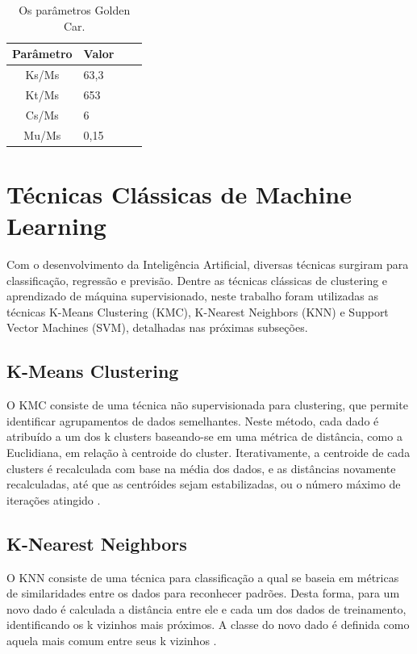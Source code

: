 \begin{table}[h!]
    \caption{Os parâmetros Golden Car.}
    \label{table:golden_car_parameters}
    \centering
    \small
    \begin{tabular}{clll}
        \toprule
        \textbf{Parâmetro} & \textbf{Valor} \\
        \toprule
        Ks/Ms & 63,3 \\
        \midrule
        Kt/Ms & 653 \\
        \midrule
        Cs/Ms & 6 \\
        \midrule
        Mu/Ms & 0,15 \\
        \bottomrule
    \end{tabular}
\end{table}

\section{Técnicas Clássicas de Machine Learning}

Com o desenvolvimento da Inteligência Artificial, diversas técnicas surgiram para classificação, regressão e previsão. Dentre as técnicas clássicas de clustering e aprendizado de máquina supervisionado, neste trabalho foram utilizadas as técnicas K-Means Clustering (KMC), K-Nearest Neighbors (KNN) e Support Vector Machines (SVM), detalhadas nas próximas subseções.

\subsection{K-Means Clustering}

O KMC consiste de uma técnica não supervisionada para clustering, que permite identificar agrupamentos de dados semelhantes. Neste método, cada dado é atribuído a um dos k clusters baseando-se em uma métrica de distância, como a Euclidiana, em relação à centroide do cluster. Iterativamente, a centroide de cada clusters é recalculada com base na média dos dados, e as distâncias novamente recalculadas, até que as centróides sejam estabilizadas, ou o número máximo de iterações atingido \cite{foley2019,nisbet2009}.

\subsection{K-Nearest Neighbors}

O KNN consiste de uma técnica para classificação a qual se baseia em métricas de similaridades entre os dados para reconhecer padrões. Desta forma, para um novo dado é calculada a distância entre ele e cada um dos dados de treinamento, identificando os k vizinhos mais próximos. A classe do novo dado é definida como aquela mais comum entre seus k vizinhos \cite{Khandelwal2018}.

